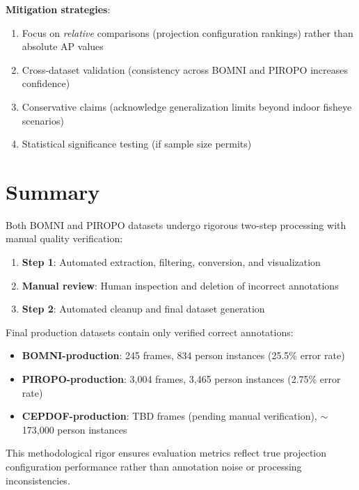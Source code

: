 \documentclass[11pt]{article}
\begin{document}
\textbf{Mitigation strategies}:
\begin{enumerate}[leftmargin=*]
    \item Focus on \textit{relative} comparisons (projection configuration rankings) rather than absolute AP values
    \item Cross-dataset validation (consistency across BOMNI and PIROPO increases confidence)
    \item Conservative claims (acknowledge generalization limits beyond indoor fisheye scenarios)
    \item Statistical significance testing (if sample size permits)
\end{enumerate}

\section{Summary}

Both BOMNI and PIROPO datasets undergo rigorous two-step processing with manual quality verification:
\begin{enumerate}[leftmargin=*]
    \item \textbf{Step 1}: Automated extraction, filtering, conversion, and visualization
    \item \textbf{Manual review}: Human inspection and deletion of incorrect annotations
    \item \textbf{Step 2}: Automated cleanup and final dataset generation
\end{enumerate}

Final production datasets contain only verified correct annotations:
\begin{itemize}[leftmargin=*]
    \item \textbf{BOMNI-production}: 245 frames, 834 person instances (25.5\% error rate)
    \item \textbf{PIROPO-production}: 3,004 frames, 3,465 person instances (2.75\% error rate)
    \item \textbf{CEPDOF-production}: TBD frames (pending manual verification), $\sim$173,000 person instances
\end{itemize}

This methodological rigor ensures evaluation metrics reflect true projection configuration performance rather than annotation noise or processing inconsistencies.
\end{document}
